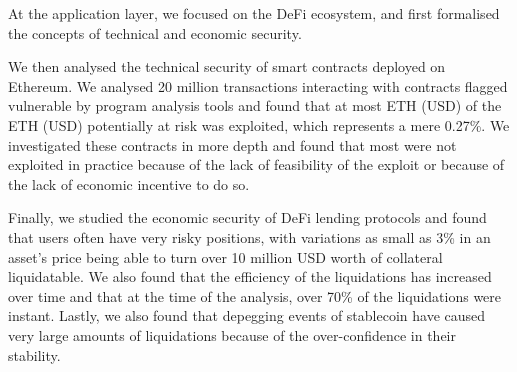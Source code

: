 At the application layer, we focused on the DeFi ecosystem, and first formalised the concepts of technical and economic security.

We then analysed the technical security of smart contracts deployed on Ethereum.
We analysed 20 million transactions interacting with contracts flagged vulnerable by program analysis tools and found that at most \ExploitedEther ETH (\ExploitedEtherUSD USD) of the \EtherClaimedVulnerable ETH (\EtherClaimedVulnerableUSD USD) potentially at risk was exploited, which represents a mere 0.27\%.
We investigated these contracts in more depth and found that most were not exploited in practice because of the lack of feasibility of the exploit or because of the lack of economic incentive to do so.

Finally, we studied the economic security of DeFi lending protocols and found that users often have very risky positions, with variations as small as 3\% in an asset's price being able to turn over 10 million USD worth of collateral liquidatable.
We also found that the efficiency of the liquidations has increased over time and that at the time of the analysis, over 70\% of the liquidations were instant.
Lastly, we also found that depegging events of stablecoin have caused very large amounts of liquidations because of the over-confidence in their stability.

